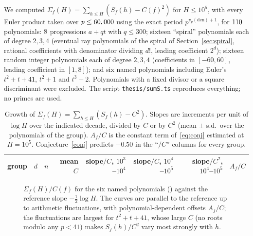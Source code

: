 \documentclass[11pt,a4paper]{article}
\theoremstyle{remark}\newtheorem{remark}[theorem]{Remark}
\begin{document}
We computed $\Sigma_f(H)=\sum_{h\le H}(S_f(h)-C(f)^2)$ for $H\le10^5$, with every Euler product taken
over $p\le60,000$ using the exact period $p^{v_p(\mathrm{den})+1}$, for $110$ polynomials: $8$
progressions $a+qt$ with $q\le300$; sixteen ``spiral'' polynomials each of degree $2,3,4$ (eventual
ray polynomials of the spiral of Section~\ref{sec:spiral}, rational coefficients with denominator
dividing $d!$, leading coefficient $2^d$); sixteen random integer polynomials each of degree $2,3,4$
(coefficients in $[-60,60]$, leading coefficient in $[1,8]$); and six named polynomials including
Euler's $t^2+t+41$, $t^2+1$ and $t^3+2$. Polynomials with a fixed divisor or a square discriminant were
excluded. The script \texttt{thesis/sumS.ts} reproduces everything; no primes are used.

\begin{table}[htbp]
\centering\footnotesize\setlength{\tabcolsep}{4.5pt}
\caption{Growth of $\Sigma_f(H)=\sum_{h\le H}(S_f(h)-C^2)$. Slopes are increments per unit of
$\log H$ over the indicated decade, divided by $C$ or by $C^2$ (mean $\pm$ s.d.\ over the polynomials of
the group). $A_f/C$ is the constant term of~\eqref{eq:conj} estimated at $H=10^5$. Conjecture~\ref{conj}
predicts $-0.50$ in the ``$/C$'' columns for every group.}\label{tab:sums}
\begin{tabular}{lrrrrrrr}
\toprule
group & $d$ & $n$ & mean $C$ & slope$/C$, $10^3$--$10^4$ & slope$/C$, $10^4$--$10^5$ & slope$/C^2$, $10^4$--$10^5$ & $A_f/C$\\
\midrule

\end{tabular}
\end{table}

\begin{figure}[t]
\centering
{}
\caption{$\Sigma_f(H)/C(f)$ for the six named polynomials (\sumsNamedLegend) against the reference
slope $-\tfrac12\log H$. The curves are parallel to the reference up to arithmetic fluctuations, with
polynomial-dependent offsets $A_f/C$; the fluctuations are largest for $t^2+t+41$, whose large
$C$ (no roots modulo any $p<41$) makes $S_f(h)/C^2$ vary most strongly with $h$.}\label{fig:curves}
\end{figure}
\end{document}
